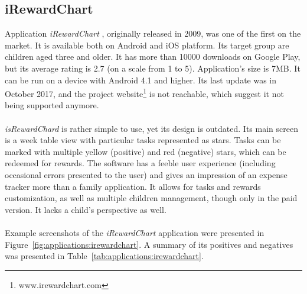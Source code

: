 \subsection{iRewardChart}\label{subsec:market:solutions:irewardchart}
Application \textit{iRewardChart} \cite{IRewardChartAppsGoogle,IRewardChartChoreTracker}, originally released in 2009, was one of the first on the market. It is available both on Android and iOS platform. Its target group are children aged three and older. It has more than 10000 downloads on Google Play, but its average rating is 2.7 (on a scale from 1 to 5). Application's size is 7MB. It can be run on a device with Android 4.1 and higher. Its last update was in October 2017, and the project website\footnote{www.irewardchart.com} is not reachable, which suggest it not being supported anymore.
\\\\
\textit{isRewardChard} is rather simple to use, yet its design is outdated. Its main screen is a week table view with particular tasks represented as stars. Tasks can be marked with multiple yellow (positive) and red (negative) stars, which can be redeemed for rewards. The software has a feeble user experience (including occasional errors presented to the user) and gives an impression of an expense tracker more than a family application. It allows for tasks and rewards customization, as well as multiple children management, though only in the paid version. It lacks a child's perspective as well.
\\\\
Example screenshots of the \textit{iRewardChart} application were presented in Figure~\ref{fig:applications:irewardchart}. A summary of its positives and negatives was presented in Table~\ref{tab:applications:irewardchart}.
\\





